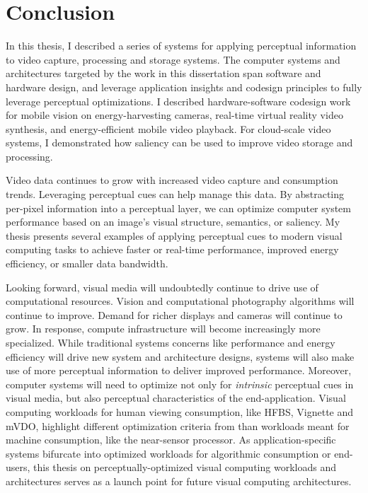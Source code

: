 \chapter{Conclusion}
\label{ch:concl}

In this thesis, I described a series of systems for applying perceptual information to video capture, processing and storage systems.
The computer systems and architectures targeted by the work in this dissertation span software and hardware design, and leverage application insights and codesign principles to fully leverage perceptual optimizations.
I described hardware-software codesign work for mobile vision on energy-harvesting cameras, real-time virtual reality video synthesis, and energy-efficient mobile video playback.
For cloud-scale video systems, I demonstrated how saliency can be used to improve video storage and processing.

Video data continues to grow with increased video capture and consumption trends. Leveraging perceptual cues can help manage this data.
By abstracting per-pixel information into a perceptual layer, we can optimize computer system performance based on an image's visual structure, semantics, or saliency.
My thesis presents several examples of applying perceptual cues to modern visual computing tasks to achieve faster or real-time performance, improved energy efficiency, or smaller data bandwidth.

Looking forward, visual media will undoubtedly continue to drive use of computational resources.
Vision and computational photography algorithms will continue to improve.
Demand for richer displays and cameras will continue to grow.
In response, compute infrastructure will become increasingly more specialized.
While traditional systems concerns like performance and energy efficiency will drive new system and architecture designs, systems will also make use of more perceptual information to deliver improved performance.
Moreover, computer systems will need to optimize not only for \emph{intrinsic} perceptual cues in visual media, but also perceptual characteristics of the end-application.
Visual computing workloads for human viewing consumption, like HFBS, Vignette and mVDO, highlight different optimization criteria from than workloads meant for machine consumption, like the near-sensor processor.
As application-specific systems bifurcate into optimized workloads for algorithmic consumption or end-users, this thesis on perceptually-optimized visual computing workloads and architectures serves as a launch point for future visual computing architectures.
